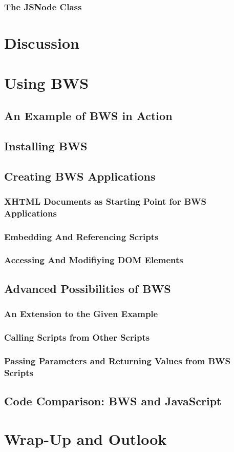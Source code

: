    \subsubsection{The JSNode Class}
\section{Discussion}

\section{Using BWS}

 \subsection{An Example of BWS in Action}
 \subsection{Installing BWS}
 \subsection{Creating BWS Applications}
 
  \subsubsection{XHTML Documents as Starting Point for BWS Applications}
  \label{sec:XHTMLDocumentsAsStartingPoint}

   

  \subsubsection{Embedding And Referencing Scripts}

 

  \subsubsection{Accessing And Modifiying DOM Elements}


 \subsection{Advanced Possibilities of BWS}
  \subsubsection{An Extension to the Given Example}
  \subsubsection{Calling Scripts from Other Scripts}
  \subsubsection{Passing Parameters and Returning Values from BWS Scripts}
 \subsection{Code Comparison: BWS and JavaScript}
\section{Wrap-Up and Outlook}
